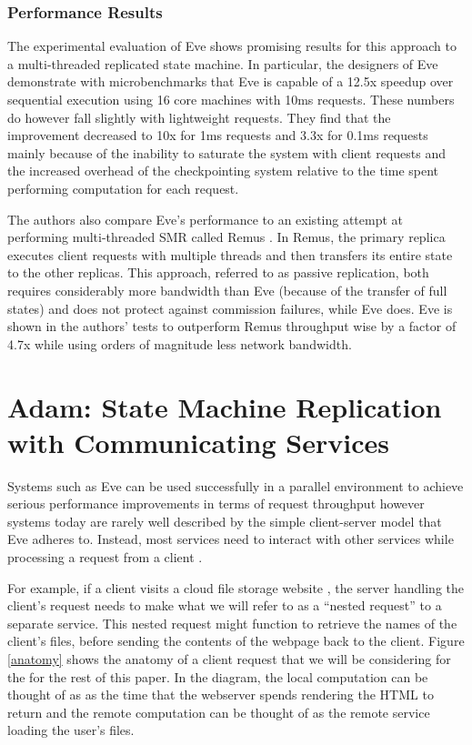 \documentclass[11pt, oneside]{report}
\begin{document}
\subsection{Performance Results}\label{EveResults}

The experimental evaluation of Eve shows promising results for this approach to a multi-threaded replicated state machine. 
In particular, the designers of Eve demonstrate with microbenchmarks that Eve is capable of a 12.5x speedup over sequential execution using 16 core machines with 10ms requests. 
These numbers do however fall slightly with lightweight requests. 
They find that the improvement decreased to 10x for 1ms requests and 3.3x for 0.1ms requests mainly because of the inability to saturate the system with client requests and the increased overhead of the checkpointing system relative to the time spent performing computation for each request.

The authors also compare Eve's performance to an existing attempt at performing multi-threaded SMR called Remus \cite{remus}. 
In Remus, the primary replica executes client requests with multiple threads and then transfers its entire state to the other replicas. 
This approach, referred to as passive replication, both requires considerably more bandwidth than Eve (because of the transfer of full states) and does not protect against commission failures, while Eve does. 
Eve is shown in the authors' tests to outperform Remus throughput wise by a factor of 4.7x while using orders of magnitude less network bandwidth.

\chapter{Adam: State Machine Replication with Communicating Services}\label{Adam}

Systems such as Eve can be used successfully in a parallel environment to achieve serious performance improvements in terms of request throughput however systems today are rarely well described by the simple client-server model that Eve adheres to.
Instead, most services need to interact with other services while processing a request from a client \cite{tao, spanner, dynamo}. 

For example, if a client visits a cloud file storage website \cite{dropbox}, the server handling the client's request needs to make what we will refer to as a ``nested request'' to a separate service. This nested request might function to retrieve the names of the client's files, before sending the contents of the webpage back to the client. Figure \ref{anatomy} shows the anatomy of a client request that we will be considering for the for the rest of this paper. In the diagram, the local computation can be thought of as as the time that the webserver spends rendering the HTML to return and the remote computation can be thought of as the remote service loading the user's files.
\end{document}
